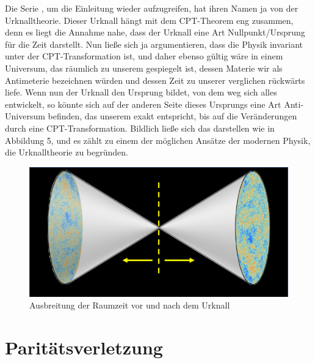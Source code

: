 \documentclass[12pt,a4paper]{scrartcl}
\numberwithin{equation}{section}
\begin{document}
Die Serie \grqq{}, um die Einleitung wieder aufzugreifen, hat ihren Namen ja von der Urknalltheorie. Dieser Urknall hängt mit dem CPT-Theorem eng zusammen, denn es liegt die Annahme nahe, dass der Urknall eine Art Nullpunkt/Ursprung für die Zeit darstellt. Nun ließe sich ja argumentieren, dass die Physik invariant unter der CPT-Transformation ist, und daher ebenso gültig wäre in einem Universum, das räumlich zu unserem gespiegelt ist, dessen Materie wir als Antimeterie bezeichnen würden und dessen Zeit zu unserer verglichen rückwärts liefe. Wenn nun der Urknall den Ursprung bildet, von dem weg sich alles entwickelt, so könnte sich auf der anderen Seite dieses Ursprungs eine Art Anti-Universum befinden, das unserem exakt entspricht, bis auf die Veränderungen durch eine CPT-Transformation. Bildlich ließe sich das darstellen wie in Abbildung 5, und es zählt zu einem der möglichen Ansätze der modernen Physik, die Urknalltheorie zu begründen. \cite{schirber18}
\begin{figure} [!ht]
  \centering
  \includegraphics{antiuniverse}
  \caption{Ausbreitung der Raumzeit vor und nach dem Urknall}
\end{figure}

  \newpage  %

  \section{Paritätsverletzung}
\end{document}
